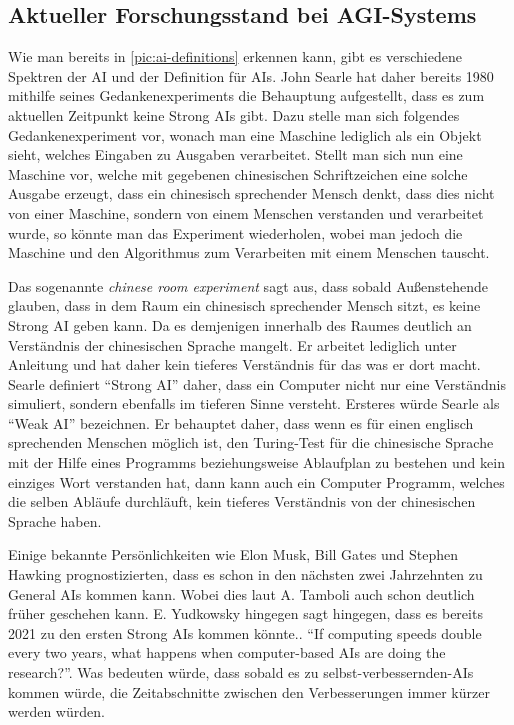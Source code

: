         \subsection{Aktueller Forschungsstand bei AGI-Systems}
            Wie man bereits in \ref{pic:ai-definitions} erkennen kann, gibt es verschiedene Spektren der AI und der
            Definition für AIs. John Searle hat daher bereits 1980 mithilfe seines Gedankenexperiments die Behauptung
            aufgestellt, dass es zum aktuellen Zeitpunkt keine Strong AIs gibt. Dazu stelle man sich folgendes
            Gedankenexperiment vor, wonach man eine Maschine lediglich als ein Objekt sieht, welches Eingaben zu
            Ausgaben verarbeitet. \cite{cole_2014} Stellt man sich nun eine Maschine vor, welche mit gegebenen
            chinesischen Schriftzeichen eine solche Ausgabe erzeugt, dass ein chinesisch sprechender Mensch denkt,
            dass dies nicht von einer Maschine, sondern von einem Menschen verstanden und verarbeitet wurde, so könnte
            man das Experiment wiederholen, wobei man jedoch die Maschine und den Algorithmus zum Verarbeiten mit einem
            Menschen tauscht.

            Das sogenannte \textit{chinese room experiment} sagt aus, dass sobald Außenstehende glauben,
            dass in dem Raum ein chinesisch sprechender Mensch sitzt, es keine Strong AI geben kann. Da es demjenigen
            innerhalb des Raumes deutlich an Verständnis der chinesischen Sprache mangelt. Er arbeitet lediglich unter
            Anleitung und hat daher kein tieferes Verständnis für das was er dort macht. Searle definiert
            ``Strong AI'' daher, dass ein Computer nicht nur eine Verständnis simuliert, sondern ebenfalls im tieferen
            Sinne versteht. Ersteres würde Searle als ``Weak AI'' bezeichnen. \cite{cole_2014} Er behauptet daher, dass
            wenn es für einen englisch sprechenden Menschen möglich ist, den Turing-Test für die chinesische Sprache mit
            der Hilfe eines Programms beziehungsweise Ablaufplan zu bestehen und kein einziges Wort verstanden hat, dann
            kann auch ein Computer Programm, welches die selben Abläufe durchläuft, kein tieferes Verständnis von der
            chinesischen Sprache haben.\cite{cole_2014}

            Einige bekannte Persönlichkeiten wie Elon Musk, Bill Gates und Stephen Hawking prognostizierten, dass es
            schon in den nächsten zwei Jahrzehnten zu General AIs kommen kann. \cite[s. 20]{Tamboli2019} Wobei dies laut
            A. Tamboli auch schon deutlich früher geschehen kann. E. Yudkowsky hingegen sagt hingegen, dass es bereits
            2021 zu den ersten Strong AIs kommen könnte.\cite{yudkowsky_2001}. ``If computing speeds double every
            two years, what happens when computer-based AIs are doing the research?''. Was bedeuten würde, dass sobald
            es zu selbst-verbessernden-AIs kommen würde, die Zeitabschnitte zwischen den Verbesserungen immer kürzer
            werden würden.

